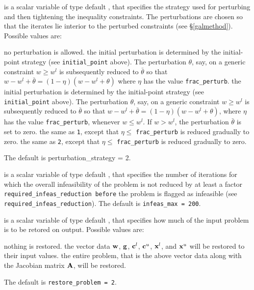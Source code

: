 \documentclass{galahad}
\begin{document}
\begin{description}

 is a scalar variable of type default \integer, 
that specifies the strategy used for perturbing and then tightening
the inequality constraints. The perturbations are chosen so that the
iterates lie interior to the perturbed constraints (see \S\ref{galmethod}).
Possible values are:

\begin{description}
 no perturbation is allowed.
 the initial perturbation is determined by the initial-point
strategy (see {\tt initial\_point} above). The perturbation $\theta$, say,
on a generic constraint $w \geq w^l$ is subsequently 
reduced to $\bar{\theta}$ so that $w - w^l + \bar{\theta}
= ( 1 - \eta ) ( w - w^l + \theta )$
where $\eta$ has the value {\tt frac\_perturb}.
 the initial perturbation is determined by the initial-point
strategy (see {\tt initial\_point} above). The perturbation $\theta$, say,
on a generic constraint $w \geq w^l$ is subsequently 
reduced to $\bar{\theta}$ so that $w - w^l + \bar{\theta}
= ( 1 - \eta ) ( w - w^l + \theta )$,
where $\eta$ has the value {\tt frac\_perturb}, whenever $w \leq w^l$. If 
$w > w^l$, the perturbation  $\bar{\theta}$ is set to zero.
 the same as {\tt 1}, except that $\eta \leq$ {\tt frac\_perturb}
is reduced gradually to zero.
 the same as {\tt 2}, except that $\eta \leq$ {\tt frac\_perturb}
is reduced gradually to zero.
\end{description}
The default is {perturbation\_strategy = 2}.


 is a scalar variable of type default \integer, that specifies
the number of iterations for which the overall infeasibility
of the problem is not reduced by at least a factor 
{\tt required\_infeas\_reduction
before} the problem is flagged as infeasible 
(see {\tt required\_infeas\_reduction}).
The default is {\tt infeas\_max = 200}.

 is a scalar variable of type default \integer, that 
specifies how much of the input problem is to be retored on output. 
Possible values are:
\begin{description}
 nothing is restored. 
 the vector data ${\mathbf{w}}$, ${\mathbf{g}}$, 
   ${\mathbf{c}}^{l}$, ${\mathbf{c}}^{u}$, ${\mathbf{x}}^{l}$, and ${\mathbf{x}}^{u}$ 
   will be restored to their input values.
 the entire problem, that is the above vector data along with 
the Jacobian matrix ${\mathbf{A}}$, will be restored.
\end{description}
The default is {\tt restore\_problem = 2}.


\end{description}
\end{document}

